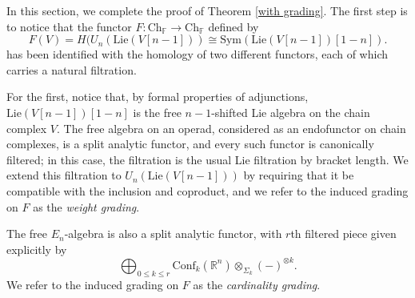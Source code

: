 \documentclass{compositio}
\theoremstyle{definition}\newtheorem{definition}{Definition}[section]
\theoremstyle{theorem}\newtheorem{lemma}[definition]{Lemma}
\theoremstyle{remark}\newtheorem*{conventions}{Conventions}
\theoremstyle{remark}\newtheorem*{acknowledgments}{Acknowledgments}
\theoremstyle{remark}\newtheorem*{outline}{Outline}
\theoremstyle{remark}\newtheorem*{questions}{Questions}
\theoremstyle{remark}\newtheorem{example}[definition]{Example}
\theoremstyle{definition}\newtheorem{construction}[definition]{Construction}
\theoremstyle{definition}\newtheorem*{convention}{Convention}
\theoremstyle{definition}\newtheorem*{conjecture}{Conjecture}
\theoremstyle{theorem}\newtheorem{theorem}[definition]{Theorem}
\theoremstyle{theorem}\newtheorem{paradigm}[definition]{Paradigm}
\theoremstyle{remark}\newtheorem{remark}[definition]{Remark}
\theoremstyle{corollary}\newtheorem{corollary}[definition]{Corollary}
\theoremstyle{theorem}\newtheorem{proposition}[definition]{Proposition}
\theoremstyle{definition}\newtheorem{question}[definition]{Question}
\begin{document}
In this section, we complete the proof of Theorem \ref{with grading}. The first step is to notice that the functor $F:{\mathrm{Ch}}_\mathbb{F}\to{\mathrm{Ch}}_\mathbb{F}$ defined by $$F(V)=H(U_n({\mathrm{Lie}}(V[n-1]))\cong{\mathrm{Sym}}({\mathrm{Lie}}(V[n-1])[1-n]).$$ has been identified with the homology of two different functors, each of which carries a natural filtration.

For the first, notice that, by formal properties of adjunctions, ${\mathrm{Lie}}(V[n-1])[1-n]$ is the free $n-1$-shifted Lie algebra on the chain complex $V$. The free algebra on an operad, considered as an endofunctor on chain complexes, is a split analytic functor, and every such functor is canonically filtered; in this case, the filtration is the usual Lie filtration by bracket length. We extend this filtration to $U_n({\mathrm{Lie}}(V[n-1]))$ by requiring that it be compatible with the inclusion and coproduct, and we refer to the induced grading on $F$ as the \emph{weight grading}.

The free $E_n$-algebra is also a split analytic functor, with $r$th filtered piece given explicitly by $$\bigoplus_{0\leq k\leq r}{\mathrm{Conf}}_k(\mathbb{R}^n)\otimes_{\Sigma_k}(-)^{\otimes k}.$$ We refer to the induced grading on $F$ as the \emph{cardinality grading}.
\end{document}
